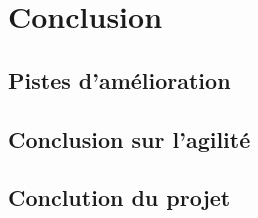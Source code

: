 \documentclass[10pt,a4paper]{article}
\begin{document}
\section{Conclusion}
\subsection{Pistes d'amélioration}

\subsection{Conclusion sur l'agilité}

\subsection{Conclution du projet}
\end{document}
